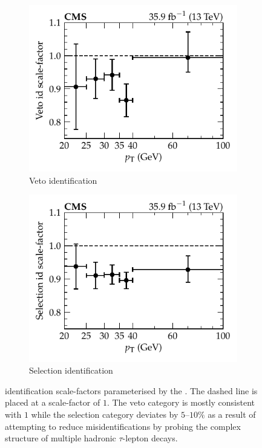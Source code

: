 \begin{figure}[htb]
    \centering
    \begin{subfigure}[b]{0.49\textwidth}
        \centering
        \includegraphics{chapters/041_corrections/images/efficiencies/objects/taus/tau_id_veto_sf.pdf}
        \caption{Veto identification}
        \label{subfiga:tau-id-scale-factors}
    \end{subfigure}
    \begin{subfigure}[b]{0.49\textwidth}
        \centering
        \includegraphics{chapters/041_corrections/images/efficiencies/objects/taus/tau_id_tight_sf.pdf}
        \caption{Selection identification}
        \label{subfigb:tau-id-scale-factors}
    \end{subfigure}
    \caption[Corrections to $\tau$-tagged jet efficiency.]{
        \Ptauh identification scale-factors parameterised by the \Ptauh \pt. The dashed line is placed at a scale-factor of $1$. The veto category is mostly consistent with $1$ while the selection category deviates by {$5$--$10\%$} as a result of attempting to reduce misidentifications by probing the complex structure of multiple hadronic $\tau$-lepton decays.
    }
    \label{fig:tau-id-scale-factors}
\end{figure}


